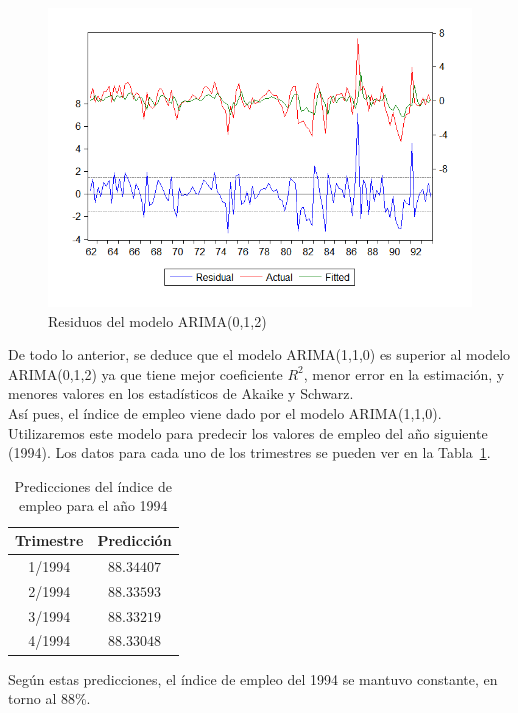 \documentclass[12pt,a4paper,twoside,openright,titlepage,final]{article}
\begin{document}
\begin{figure}[tbph!]
	\centering
	\includegraphics[width=0.7\linewidth]{imagenes/empleo/modelo2-residuos.png}
	\caption{Residuos del modelo ARIMA(0,1,2)}
	\label{fig:modelo2-residuos}
\end{figure}

De todo lo anterior, se deduce que el modelo ARIMA(1,1,0) es superior al modelo ARIMA(0,1,2) ya que tiene mejor coeficiente $R^2$, menor error en la estimación, y menores valores en los estadísticos de Akaike y Schwarz.\\

Así pues, el índice de empleo viene dado por el modelo ARIMA(1,1,0).\\

Utilizaremos este modelo para predecir los valores de empleo del año siguiente (1994). Los datos para cada uno de los trimestres se pueden ver en la Tabla~\ref{tbl:empleo-predicciones}.\\

 \begin{table}[htbp!]
 	\centering
 	\caption{Predicciones del índice de empleo para el año 1994}
 	\label{tbl:empleo-predicciones}
 	\begin{tabular}{@{}cc@{}}
 		\toprule
 		\textbf{Trimestre} & \textbf{Predicción} \\ \midrule
 		1/1994             & $88.34407$          \\
 		2/1994             & $88.33593$          \\
 		3/1994             & $88.33219$          \\
 		4/1994             & $88.33048$          \\ \bottomrule
 	\end{tabular}
 \end{table}

Según estas predicciones, el índice de empleo del 1994 se mantuvo constante, en torno al 88\%. 
\end{document}
